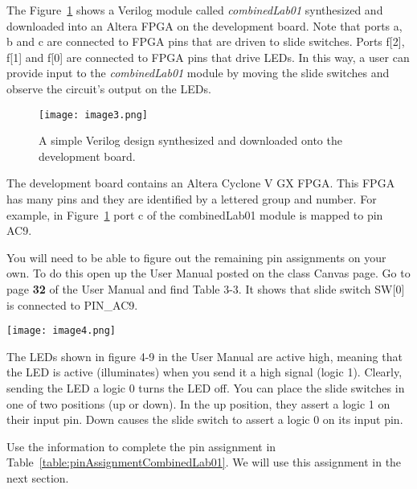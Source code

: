 The Figure~\ref{fig:simpleVerilogDownload} shows a Verilog module called \emph{combinedLab01}
synthesized and downloaded into an Altera FPGA on the development board.
Note that ports a, b and c are connected to FPGA pins that are driven to
slide switches. Ports f{[}2{]}, f{[}1{]} and f{[}0{]} are connected to
FPGA pins that drive LEDs. In this way, a user can provide input to the
\emph{combinedLab01} module by moving the slide switches and observe the
circuit's output on the LEDs.

\begin{figure}[ht]
\caption{A simple Verilog design synthesized and downloaded onto the development board.}
\texttt{[image: image3.png]}
\label{fig:simpleVerilogDownload}
\end{figure}

The development board contains an Altera Cyclone V GX FPGA. This FPGA
has many pins and they are identified by a lettered group and number.
For example, in Figure~\ref{fig:simpleVerilogDownload} port c of 
the combinedLab01 module is mapped to pin AC9.

You will need to be able to figure out the remaining pin assignments on
your own. To do this open up the User Manual posted on the class Canvas
page. Go to page \textbf{32} of the User Manual and find Table 3-3. It
shows that slide switch SW{[}0{]} is connected to PIN\_AC9.

\texttt{[image: image4.png]}

The LEDs shown in figure 4-9 in the User Manual are active high, meaning
that the LED is active (illuminates) when you send it a high signal
(logic 1). Clearly, sending the LED a logic 0 turns the LED off. You can
place the slide switches in one of two positions (up or down). In the up
position, they assert a logic 1 on their input pin. Down causes the
slide switch to assert a logic 0 on its input pin.

Use the information to complete the pin assignment in 
Table~\ref{table:pinAssignmentCombinedLab01}.  We 
will use this assignment in the next section.

